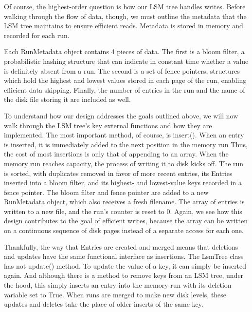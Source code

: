 \documentclass[12pt]{article}
\begin{document}
	Of course, the highest-order question is how our LSM tree handles writes. Before walking through the flow of data, though, we must outline the metadata that the LSM tree maintains to ensure efficient reads. Metadata is stored in memory and recorded for each run.
	
	Each RunMetadata object contains 4 pieces of data. The first is a bloom filter, a probabilistic hashing structure that can indicate in constant time whether a value is definitely absent from a run. The second is a set of fence pointers, structures which hold the highest and lowest values stored in each page of the run, enabling efficient data skipping. Finally, the number of entries in the run and the name of the disk file storing it are included as well.
	
	To understand how our design addresses the goals outlined above, we will now walk through the LSM tree's key external functions and how they are implemented. The most important method, of course, is insert(). When an entry is inserted, it is immediately added to the next position in the memory run Thus, the cost of most insertions is only that of appending to an array. When the memory run reaches capacity, the process of writing it to disk kicks off. The run is sorted, with duplicates removed in favor of more recent entries, its Entries inserted into a bloom filter, and its highest- and lowest-value keys recorded in a fence pointer. The bloom filter and fence pointer are added to a new RunMetadata object, which also receives a fresh filename. The array of entries is written to a new file, and the run's counter is reset to 0. Again, we see how this design contributes to the goal of efficient writes, because the array can be written on a continuous sequence of disk pages instead of a separate access for each one.
	
	Thankfully, the way that Entries are created and merged means that deletions and updates have the same functional interface as insertions. The LsmTree class has not update() method. To update the value of a key, it can simply be inserted again. And although there is a method to remove keys from an LSM tree, under the hood, this simply inserts an entry into the memory run with its deletion variable set to True. When runs are merged to make new disk levels, these updates and deletes take the place of older inserts of the same key.
	
\end{document}
